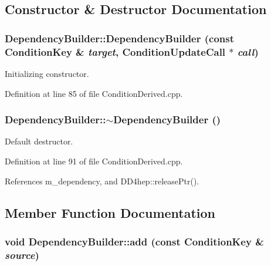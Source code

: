 \subsection{Constructor \& Destructor Documentation}
\hypertarget{class_d_d4hep_1_1_conditions_1_1_dependency_builder_a3587f9592bbecbbf5594e9953a67eea1}{
\subsubsection[{DependencyBuilder}]{\setlength{\rightskip}{0pt plus 5cm}DependencyBuilder::DependencyBuilder (const {\bf ConditionKey} \& {\em target}, \/  {\bf ConditionUpdateCall} $\ast$ {\em call})}}
\label{class_d_d4hep_1_1_conditions_1_1_dependency_builder_a3587f9592bbecbbf5594e9953a67eea1}


Initializing constructor. 

Definition at line 85 of file ConditionDerived.cpp.\hypertarget{class_d_d4hep_1_1_conditions_1_1_dependency_builder_a133550ebf6fef71c365258c1034a4957}{
\subsubsection[{$\sim$DependencyBuilder}]{\setlength{\rightskip}{0pt plus 5cm}DependencyBuilder::$\sim$DependencyBuilder ()}}
\label{class_d_d4hep_1_1_conditions_1_1_dependency_builder_a133550ebf6fef71c365258c1034a4957}


Default destructor. 

Definition at line 91 of file ConditionDerived.cpp.

References m\_\-dependency, and DD4hep::releasePtr().

\subsection{Member Function Documentation}
\hypertarget{class_d_d4hep_1_1_conditions_1_1_dependency_builder_afbfb0aa5a9cd8a969588d705cca795e5}{
\subsubsection[{add}]{\setlength{\rightskip}{0pt plus 5cm}void DependencyBuilder::add (const {\bf ConditionKey} \& {\em source})}}
\label{class_d_d4hep_1_1_conditions_1_1_dependency_builder_afbfb0aa5a9cd8a969588d705cca795e5}


